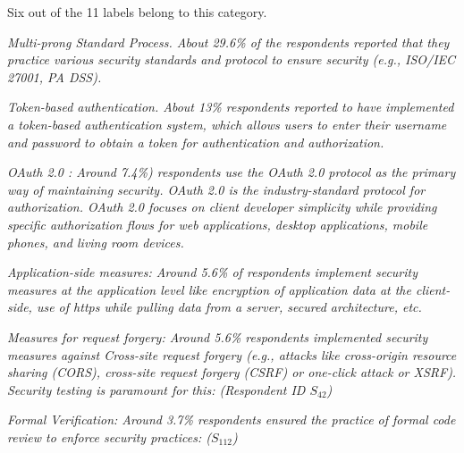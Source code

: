 \begin{inparaenum}[(1)]
\item {} Six out of the 11 labels belong to this category. 
\begin{inparaenum}
\item \it{Multi-prong Standard Process}. About 29.6\% of the respondents
reported that they practice various security standards and protocol to
ensure security (e.g., ISO/IEC 27001, PA DSS).
\item \it{Token-based authentication.} About 13\% respondents reported to 
have implemented a token-based authentication system, which 
allows users to enter their username and password to obtain a token for authentication and authorization.
\item \it{OAuth 2.0} : Around 7.4\%) respondents use the OAuth 2.0
protocol as the primary way of maintaining security. OAuth 2.0 is the industry-standard protocol for
authorization. OAuth 2.0 focuses on client developer simplicity while providing
specific authorization flows for web applications, desktop applications, mobile
phones, and living room devices. %
\item \it{Application-side measures}: Around 5.6\% of respondents 
implement security measures at the application level like encryption of application data at the client-side, use of https while
pulling data from a server, secured architecture, etc.
\item \it{Measures for request forgery}: Around 5.6\% respondents implemented security measures against
Cross-site request forgery (e.g., attacks like
cross-origin resource sharing (CORS), cross-site request forgery (CSRF) or
one-click attack or XSRF). Security testing is paramount for this:  (Respondent ID $S_{42}$)
    \item \it{Formal Verification}: Around 3.7\% respondents ensured the practice of formal code review to enforce security practices:  ($S_{112}$)
    \end{inparaenum}


\end{inparaenum}
